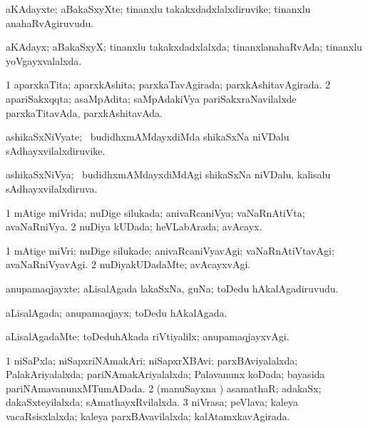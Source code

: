 \bentry
{}
\gl{\nA}
\bmng
aKAdayxte; aBakaSxyXte; tinanxlu takakxdadxlalxdiruvike; tinanxlu anahaRvAgiruvudu. 
\emng
\eentry

\bentry
{}
\gl{\gu}
\bmng
aKAdayx; aBakaSxyX; tinanxlu takakxdadxlalxda; tinanxlanahaRvAda; tinanxlu yoVgayxvalalxda. 
\emng
\eentry

\bentry
{}
\gl{\gu}
\bmng
\bnum
\num{1} aparxkaTita; aparxkAshita; parxkaTavAgirada; parxkAshitavAgirada. 
\num{2} apariSakxqqta; asaMpAdita; saMpAdakiVya pariSakxraNavilalxde parxkaTitavAda, parxkAshitavAda. 
\enum
\emng
\eentry

\bentry
{}
\gl{\nA}
\bmng
ashikaSxNiVyate; \kanmu\ budidhxmAMdayxdiMda shikaSxNa niVDalu sAdhayxvilalxdiruvike. 
\emng
\eentry

\bentry
{}
\gl{\gu}
\bmng
ashikaSxNiVya; \kanmu\ budidhxmAMdayxdiMdAgi shikaSxNa niVDalu, kalisalu sAdhayxvilalxdiruva. 
\emng
\eentry

\bentry
{}
\gl{\gu}
\bmng
\bnum
\num{1} mAtige miVrida; nuDige silukada; anivaRcaniVya; vaNaRnAtiVta; avaNaRniVya. 
\num{2} nuDiya kUDada; heVLabArada; avAcayx. 
\enum
\emng
\eentry

\bentry
{}
\gl{\kirxvi}
\bmng
\bnum
\num{1} mAtige miVri; nuDige silukade; anivaRcaniVyavAgi; vaNaRnAtiVtavAgi; avaNaRniVyavAgi. 
\num{2} nuDiyakUDadaMte; avAcayxvAgi. 
\enum
\emng
\eentry

\bentry
{}
\gl{\nA}
\bmng
anupamaqjayxte; aLisalAgada lakaSxNa, guNa; toDedu hAkalAgadiruvudu. 
\emng
\eentry

\bentry
{}
\gl{\gu}
\bmng
aLisalAgada; anupamaqjayx; toDedu hAkalAgada. 
\emng
\eentry

\bentry
{}
\gl{\kirxvi}
\bmng
aLisalAgadaMte; toDeduhAkada riVtiyalilx; anupamaqjayxvAgi. 
\emng
\eentry

\bentry
{}
\gl{\gu}
\bmng
\bnum
\num{1} niSaPxla; niSapxriNAmakAri; niSapxrXBAvi; parxBAviyalalxda; PalakAriyalalxda; pariNAmakAriyalalxda; Palavanunx koDada; bayasida pariNAmavanunxMTumADada. 
\num{2} (manuSayxna \vi) asamathaR; adakaSx; dakaSxteyilalxda; sAmathayxRvilalxda. 
\num{3} niVrasa; peVlava; kaleya vacaRsisxlalxda; kaleya parxBAvavilalxda; kalAtamxkavAgirada. 
\enum
\emng
\eentry

